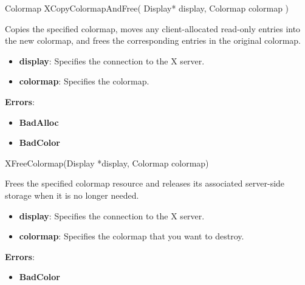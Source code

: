 \documentclass{report}
\begin{document}
\begin{itemize}
            \begin{cppcode}
                Colormap XCopyColormapAndFree(
                    Display* display,
                    Colormap colormap
                )
            \end{cppcode}
            \bigbreak \noindent
            Copies the specified colormap, moves any client-allocated read-only entries into the new colormap, and frees the corresponding entries in the original colormap.
            \begin{itemize}
                \item \textbf{display}: Specifies the connection to the X server.
                \item \textbf{colormap}: Specifies the colormap.
            \end{itemize}
            \bigbreak \noindent
            \textbf{Errors}:
            \begin{itemize}
                \item \textbf{BadAlloc}
                \item \textbf{BadColor}
            \end{itemize}

            \begin{cppcode}
                XFreeColormap(Display *display, Colormap colormap)
            \end{cppcode}
            \bigbreak \noindent
            Frees the specified colormap resource and releases its associated server-side storage when it is no longer needed.
            \begin{itemize}
                \item \textbf{display}: Specifies the connection to the X server.
                \item \textbf{colormap}: Specifies the colormap that you want to destroy.
            \end{itemize}
            \bigbreak \noindent
            \textbf{Errors}:
            \begin{itemize}
                \item \textbf{BadColor}
            \end{itemize}


\end{itemize}
\end{document}
